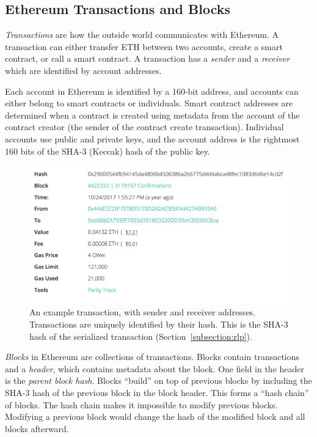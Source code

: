 \documentclass[12pt]{article}
\begin{document}
\subsection{Ethereum Transactions and Blocks}

\emph{Transactions} are how the outside world communicates with Ethereum. A transaction can either transfer ETH between two accounts, create a smart contract, or call a smart contract. A transaction has a \emph{sender} and a \emph{receiver} which are identified by account addresses.

Each account in Ethereum is identified by a 160-bit address, and accounts can either belong to smart contracts or individuals. Smart contract addresses are determined when a contract is created using metadata from the account of the contract creator (the sender of the contract create transaction). Individual accounts use public and private keys, and the account address is the rightmost 160 bits of the SHA-3 (Keccak) hash of the public key. %

\begin{figure}[H]
  \centering
  \includegraphics[width=\textwidth]{../figures/background/transactions/example_transaction.png}
  \caption{An example transaction, with sender and receiver addresses. Transactions are uniquely identified by their hash. This is the SHA-3 hash of the serialized transaction (Section~\ref{subsection:rlp}).}
\end{figure}

\emph{Blocks} in Ethereum are collections of transactions. Blocks contain transactions and a \emph{header}, which contains metadata about the block. One field in the header is the \emph{parent block hash}. Blocks ``build'' on top of previous blocks by including the SHA-3 hash of the previous block in the block header. This forms a ``hash chain'' of blocks. The hash chain makes it impossible to modify previous blocks. Modifying a previous block would change the hash of the modified block and all blocks afterward.
\end{document}
